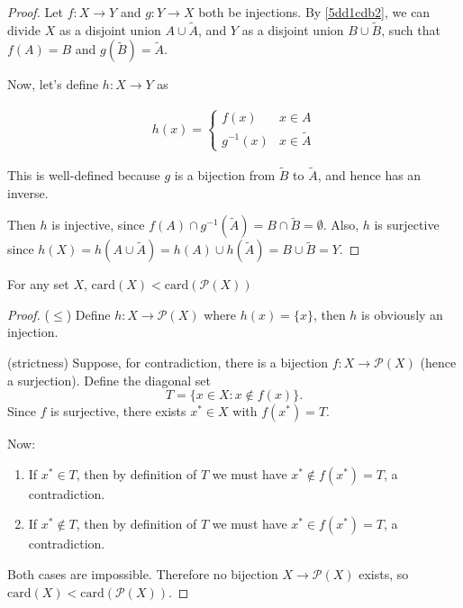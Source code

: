 \begin{proof}
    Let $f: X \to Y$ and $g: Y \to X$ both be injections.
    By \cref{5dd1cdb2}, we can divide $X$ as a disjoint union $A \cup \tilde{A}$, and $Y$
    as a disjoint union $B \cup \tilde{B}$, such that $f(A) = B$ and $g(\tilde{B}) = \tilde{A}$.

    Now, let's define $h: X \to Y$ as

    \begin{align*}
        h(x) = \begin{cases}
            f(x) & x \in A\\
            g^{-1}(x) & x \in \tilde{A}
        \end{cases}
    \end{align*}

    This is well-defined because $g$ is a bijection from $\tilde{B}$ to $\tilde{A}$, and hence has an inverse.

    Then $h$ is injective, since $f(A) \cap g^{-1}(\tilde{A}) = B \cap \tilde{B} = \emptyset$. Also, $h$
    is surjective since $h(X) = h(A \cup \tilde{A}) = h(A) \cup h(\tilde{A}) = B \cup \tilde{B} = Y$.
\end{proof}

\begin{prop}
For any set $X$, $\mathrm{card}(X) < \mathrm{card}(\mathscr{P}(X))$
\end{prop}

\begin{proof}
    ($\le$) Define $h: X \to \mathscr{P}(X)$ where $h(x) = \{x\}$, then $h$ is obviously an injection.


(strictness) Suppose, for contradiction, there is a bijection $f:X\to\mathscr{P}(X)$
(hence a surjection). Define the diagonal set
\[
T=\{x\in X: x\notin f(x)\}.
\]
Since $f$ is surjective, there exists $x^*\in X$ with $f(x^*)=T$.

Now:

\begin{enumerate}
    \item If $x^*\in T$, then by definition of $T$ we must have $x^*\notin f(x^*)=T$,
  a contradiction.

    \item If $x^*\notin T$, then by definition of $T$ we must have $x^*\in f(x^*)=T$,
  a contradiction.

\end{enumerate}
Both cases are impossible. Therefore no bijection $X\to\mathscr{P}(X)$ exists, so
$\mathrm{card}(X)<\mathrm{card}(\mathscr{P}(X))$.
\end{proof}


